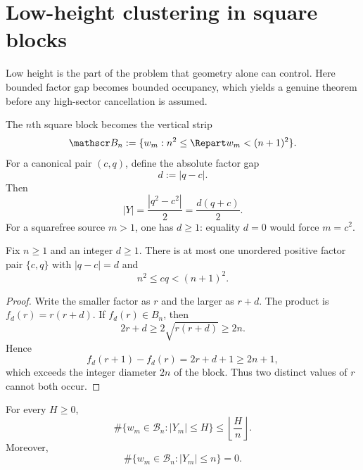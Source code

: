 \section{Low-height clustering in square blocks}
\label{sec:clustering}

Low height is the part of the problem that geometry alone can control.  Here bounded factor gap becomes bounded occupancy, which yields a genuine theorem before any high-sector cancellation is assumed.

The $n$th square block becomes the vertical strip
\begin{equation}
 \mathscr B_n
 :=\{w_m:n^2\le\Repart w_m<(n+1)^2\}.
 \label{eq:complex-block}
\end{equation}
For a canonical pair $(c,q)$, define the absolute factor gap
\begin{equation}
 d:=|q-c|.
 \label{eq:absolute-gap}
\end{equation}
Then
\begin{equation}
 |Y|
 =\frac{|q^2-c^2|}{2}
 =\frac{d(q+c)}{2}.
 \label{eq:Y-absolute-gap}
\end{equation}
For a squarefree source $m>1$, one has $d\ge1$: equality $d=0$ would force $m=c^2$.

\begin{lemma}
\label{lem:one-product-gap}
Fix $n\ge1$ and an integer $d\ge1$.  There is at most one unordered positive factor pair $\{c,q\}$ with $|q-c|=d$ and
\begin{equation}
 n^2\le cq<(n+1)^2.
 \label{eq:gap-block-condition}
\end{equation}
\end{lemma}

\begin{proof}
Write the smaller factor as $r$ and the larger as $r+d$.  The product is $f_d(r)=r(r+d)$.  If $f_d(r)\in B_n$, then
\[
 2r+d\ge2\sqrt{r(r+d)}\ge2n.
\]
Hence
\[
 f_d(r+1)-f_d(r)=2r+d+1\ge2n+1,
\]
which exceeds the integer diameter $2n$ of the block.  Thus two distinct values of $r$ cannot both occur.
\end{proof}

\begin{theorem}
\label{thm:absolute-clustering}
For every $H\ge0$,
\begin{equation}
 \boxed{
 \#\{w_m\in\mathscr B_n:|Y_m|\le H\}
 \le
 \left\lfloor\frac{H}{n}\right\rfloor.
 }
 \label{eq:absolute-clustering}
\end{equation}
Moreover,
\begin{equation}
 \boxed{
 \#\{w_m\in\mathscr B_n:|Y_m|\le n\}=0.
 }
 \label{eq:no-height-n-points}
\end{equation}
\end{theorem}

